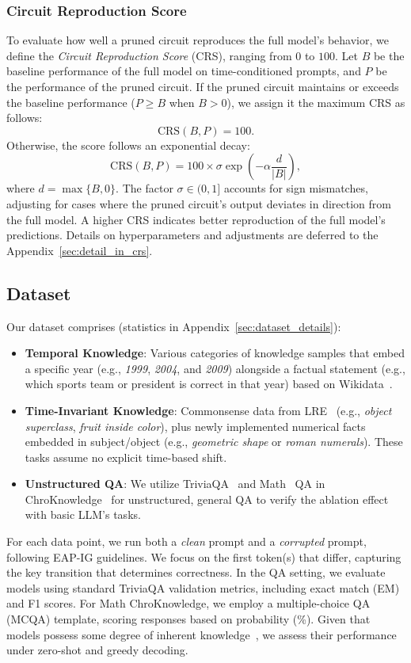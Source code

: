 \subsubsection{Circuit Reproduction Score}
To evaluate how well a pruned circuit reproduces the full model’s behavior, we define the \emph{Circuit Reproduction Score} (CRS), ranging from $0$ to $100$. 
Let $B$ be the baseline performance of the full model on time-conditioned prompts, and $P$ be the performance of the pruned circuit. 
If the pruned circuit maintains or exceeds the baseline performance ($P \geq B$ when $B>0$), we assign it the maximum CRS as follows:
\begin{equation}
\mathrm{CRS}(B,P) = 100.
\end{equation}
Otherwise, the score follows an exponential decay:
\begin{equation}
\mathrm{CRS}(B,P) = 100 \times \sigma \exp\left(-\alpha \frac{d}{|B|} \right),
\end{equation}
where $d = \max\{B, 0\}$.
The factor $\sigma \in (0,1]$ accounts for sign mismatches, adjusting for cases where the pruned circuit’s output deviates in direction from the full model.
A higher CRS indicates better reproduction of the full model’s predictions. Details on hyperparameters and adjustments are deferred to the Appendix~\ref{sec:detail_in_crs}.

\subsection{Dataset}
\label{subsec:dataset}
Our dataset comprises (statistics in Appendix~\ref{sec:dataset_details}):
\begin{itemize}
    \item \textbf{Temporal Knowledge}: Various categories of knowledge samples that embed a specific year (e.g., \emph{1999}, \emph{2004}, and \emph{2009}) alongside a factual statement (e.g., which sports team or president is correct in that year) based on Wikidata~\citep{wikidata}.
    \item \textbf{Time-Invariant Knowledge}: Commonsense data from LRE~\citep{lre} (e.g., \emph{object superclass}, \emph{fruit inside color}), plus newly implemented numerical facts embedded in subject/object (e.g., \emph{geometric shape} or \emph{roman numerals}). 
    These tasks assume no explicit time-based shift.
    \item \textbf{Unstructured QA}: We utilize TriviaQA~\citep{triviaqa} and Math~\citep{mathkg} QA in ChroKnowledge~\citep{chroknowledge} for unstructured, general QA to verify the ablation effect with basic LLM's tasks.
\end{itemize}
For each data point, we run both a \emph{clean} prompt and a \emph{corrupted} prompt, following EAP-IG guidelines.
We focus on the first token(s) that differ, capturing the key transition that determines correctness.
In the QA setting, we evaluate models using standard TriviaQA validation metrics, including exact match (EM) and F1 scores. 
For Math ChroKnowledge, we employ a multiple-choice QA (MCQA) template, scoring responses based on probability (\%). 
Given that models possess some degree of inherent knowledge~\citep{KC}, we assess their performance under zero-shot and greedy decoding.


